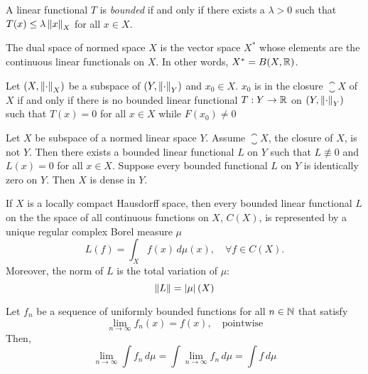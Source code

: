A linear functional $T$ is \textit{bounded} if and only if there exists a $\lambda >
0$ such that $T(x) \leq \lambda \left\| x \right\|_{X}$ for all $x \in X$.

\begin{definition}
   The dual space of normed space $X$ is the vector space $X^*$ whose elements
   are the continuous linear functionals on $X$. In other words, $X^* = B(X,
   \mathbb{R})$.
\end{definition}

\begin{theorem}
   \label{thm:hahn_banach_1}
   Let $(X, \left\| \cdot \right\|_{X})$ be a subspace of $(Y, \left\| \cdot \right\|_{Y})$ and $x_0
   \in X$. $x_0$ is in the closure $\closure{X}$ of $X$ if and only if there is
   no bounded linear functional $T: Y \to \mathbb{R}$ on $(Y, \left\| \cdot \right\|_{Y})$ such
   that $T(x) = 0$ for all $x \in X$ while $F(x_0) \not= 0$
\end{theorem}


\begin{corollary}
   \label{thm:hahn_banach_2}
   Let $X$ be subspace of a normed linear space $Y$. Assume $\closure{X}$, the
   closure of $X$, is not $Y$. Then there exists a bounded linear functional $L$
   on $Y$ such that $L \not\equiv 0$ and $L(x) = 0$ for all $x \in X$. Suppose
   every bounded functional $L$ on $Y$ is identically zero on $Y$. Then $X$ is
   dense in $Y$.
\end{corollary}

\begin{theorem}
   \cite[Theorem 6.19, p. 130]{rudinRealComplexAnalysis1987}
   \label{thm:riesz_rep}

   If $X$ is a locally compact Hausdorff space, then every bounded linear
   functional $L$ on the the space of all continuous functions on $X$, $C(X)$,
   is represented by a unique regular complex Borel measure $\mu$
   \begin{equation*}
      L(f) = \int_{X} f(x) \,d\mu(x), \quad \forall f \in C(X).
   \end{equation*}
   Moreover, the norm of $L$ is the total variation of $\mu$:
   \begin{equation}
      \left\| L \right\| = \left| \mu \right|(X)
   \end{equation}
\end{theorem}

\begin{theorem}
   Let $f_n$ be a sequence of uniformly bounded functions for all $n \in \mathbb{N}$
   that satisfy
   \begin{equation}
      \lim_{n\to\infty} f_n(x) = f(x), \quad \text{pointwise}
   \end{equation}
   Then, 
   \begin{equation}
      \lim_{n\to\infty}\int f_n \,d\mu = \int \lim_{n\to\infty} f_n \,d\mu = \int f \,d\mu
   \end{equation}
\end{theorem}

